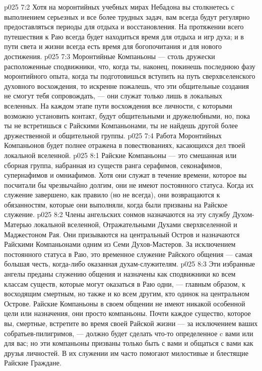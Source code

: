 \vs p025 7:2 Хотя на моронтийных учебных мирах Небадона вы столкнетесь с выполнением серьезных и все более трудных задач, вам всегда будут регулярно предоставляться периоды для отдыха и восстановления. На протяжении всего путешествия к Раю всегда будет находиться время для отдыха и игр духа; и в пути света и жизни всегда есть время для богопочитания и для нового достижения.
\vs p025 7:3 Моронтийные Компаньоны --- столь дружески расположенные сподвижники, что, когда ты, наконец, покинешь последнюю фазу моронтийного опыта, когда ты подготовишься вступить на путь сверхвселенского духовного восхождения, то искренне пожалешь, что эти общительные создания не смогут тебя сопровождать, --- они служат только лишь в локальных вселенных. На каждом этапе пути восхождения все личности, с которыми возможно установить контакт, будут общительными и дружелюбными, но, пока ты не встретишься с Райскими Компаньонами, ты не найдешь другой более дружественной и общительной группы.
\vs p025 7:4 Работа Моронтийных Компаньонов будет полнее отражена в повествованиях, касающихся дел твоей локальной вселенной.
\vs p025 8:1 Райские Компаньоны --- это смешанная или сборная группа, набранная из существ ранга серафимов, секонафимов, супернафимов и омниафимов. Хотя они служат в течение времени, которое вы посчитали бы чрезвычайно долгим, они не имеют постоянного статуса. Когда их служение завершено, как правило (но не всегда), они возвращаются к обязанностям, которые они выполняли, когда были призваны на Райское служение.
\vs p025 8:2 Члены ангельских сонмов назначаются на эту службу Духом\hyp{}Матерью локальной вселенной, Отражательными Духами сверхвселенной и Маджестоном Рая. Они призываются на центральный Остров и назначаются Райскими Компаньонами одним из Семи Духов\hyp{}Мастеров. За исключением постоянного статуса в Раю, это временное служение Райского общения --- самая большая честь, когда\hyp{}либо оказанная духам\hyp{}служителям.
\vs p025 8:3 Эти избранные ангелы преданы служению общения и назначены как сподвижники ко всем классам существ, которые могут оказаться в Раю одни, --- главным образом, к восходящим смертным, но также и ко всем другим, кто одинок на центральном Острове. Райские Компаньоны в своем общении не имеют никакой особенной цели или назначения, они просто компаньоны. Почти каждое существо, которое вы, смертные, встретите во время своей Райской жизни --- за исключением ваших собратьев\hyp{}пилигримов, --- должно будет сделать что\hyp{}то определенное c вами или для вас; но эти компаньоны призваны только быть с вами и общаться с вами как друзья личностей. В их служении им часто помогают милостивые и блестящие Райские Граждане.
